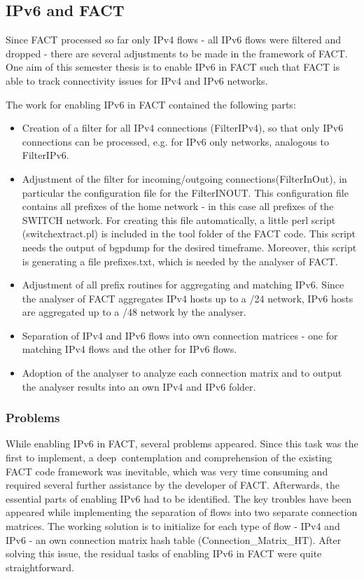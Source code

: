 \subsection{IPv6 and FACT} Since FACT processed so far only IPv4 flows - all
IPv6 flows were filtered and dropped - there are several adjustments to be made
in the framework of FACT. One aim of this semester thesis is to enable IPv6 in
FACT such that FACT is able to track connectivity issues for IPv4 and IPv6
networks.

The work for enabling IPv6 in FACT contained the following parts:
\begin{itemize}
	\item Creation of a filter for all IPv4 connections
	(FilterIPv4), so that only IPv6 connections can be processed, e.g. for IPv6 only
	networks, analogous to FilterIPv6.
	\item Adjustment of the filter for incoming/outgoing connections(FilterInOut),
	in particular the configuration file for the FilterINOUT. This configuration
	file contains all prefixes of the home network - in this case all prefixes of
	the SWITCH network. For creating this file automatically, a little perl script
	(switchextract.pl) is included in the tool folder of the FACT code. This script
	needs the output of bgpdump for the desired timeframe. Moreover, this script is
	generating a file prefixes.txt, which is needed by the analyser of FACT.
	\item Adjustment of all prefix routines for aggregating and matching IPv6.
	Since the analyser of FACT aggregates IPv4 hosts up to a /24 network, IPv6
	hosts are aggregated up to a /48 network by the analyser.
	\item Separation of IPv4 and IPv6 flows into own connection matrices - one for
	matching IPv4 flows and the other for IPv6 flows.
	\item Adoption of the analyser to analyze each connection matrix and to output
	the analyser results into an own IPv4 and IPv6 folder.
\end{itemize}

\subsubsection{Problems}

While enabling IPv6 in FACT, several problems appeared. Since this task was the
first to implement, a deep contemplation and comprehension of the existing FACT
code framework was inevitable, which was very time consuming and required
several further assistance by the developer of FACT. Afterwards, the essential
parts of enabling IPv6 had to be identified. The key troubles have been appeared
while implementing the separation of flows into two separate connection
matrices. The working solution is to initialize for each type of flow - IPv4 and
IPv6 - an own connection matrix hash table (Connection\_Matrix\_HT). After
solving this issue, the residual tasks of enabling IPv6 in FACT were quite
straightforward.

